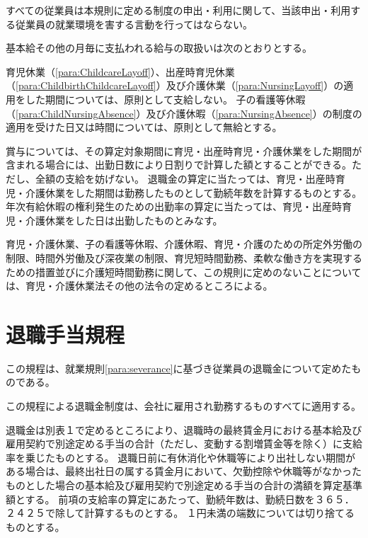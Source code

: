 \documentclass[10pt,a4paper,uplatex]{jsarticle}
\begin{document}
すべての従業員は本規則に定める制度の申出・利用に関して、当該申出・利用する従業員の就業環境を害する言動を行ってはならない。
\label{para:childcarecaregiverharrassment}

基本給その他の月毎に支払われる給与の取扱いは次のとおりとする。
\begin{enumerate}
    \itm 育児休業（\ref{para:ChildcareLayoff}）、出産時育児休業（\ref{para:ChildbirthChildcareLayoff}）及び介護休業（\ref{para:NursingLayoff}）の適用をした期間については、原則として支給しない。
    \itm 子の看護等休暇（\ref{para:ChildNursingAbsence}）及び介護休暇（\ref{para:NursingAbsence}）の制度の適用を受けた日又は時間については、原則として無給とする。
\end{enumerate}
\term 賞与については、その算定対象期間に育児・出産時育児・介護休業をした期間が含まれる場合には、出勤日数により日割りで計算した額とすることができる。ただし、全額の支給を妨げない。
\term 退職金の算定に当たっては、育児・出産時育児・介護休業をした期間は勤務したものとして勤続年数を計算するものとする。
\term 年次有給休暇の権利発生のための出勤率の算定に当たっては、育児・出産時育児・介護休業をした日は出勤したものとみなす。

育児・介護休業、子の看護等休暇、介護休暇、育児・介護のための所定外労働の制限、時間外労働及び深夜業の制限、育児短時間勤務、柔軟な働き方を実現するための措置並びに介護短時間勤務に関して、この規則に定めのないことについては、育児・介護休業法その他の法令の定めるところによる。


\clearpage
\section{退職手当規程}

この規程は、就業規則\ref{para:severance}に基づき従業員の退職金について定めたものである。

この規程による退職金制度は、会社に雇用され勤務するものすべてに適用する。

退職金は別表１で定めるところにより、退職時の最終賃金月における基本給及び雇用契約で別途定める手当の合計（ただし、変動する割増賃金等を除く）に支給率を乗じたものとする。
\term 退職日前に有休消化や休職等により出社しない期間がある場合は、最終出社日の属する賃金月において、欠勤控除や休職等がなかったものとした場合の基本給及び雇用契約で別途定める手当の合計の満額を算定基準額とする。
\term 前項の支給率の算定にあたって、勤続年数は、勤続日数を３６５．２４２５で除して計算するものとする。
\term １円未満の端数については切り捨てるものとする。
\end{document}
